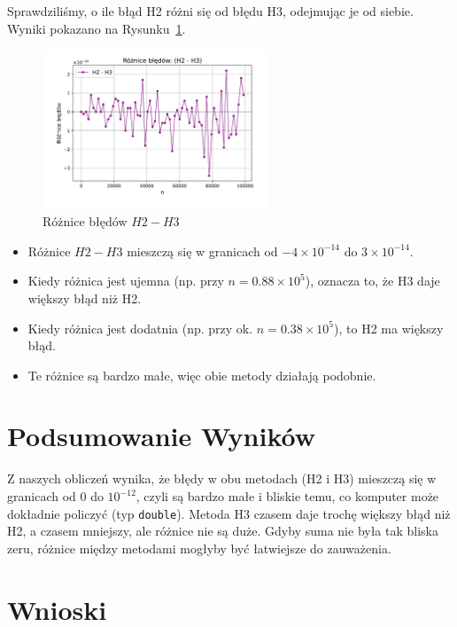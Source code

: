 \documentclass[a4paper,12pt]{article}
\begin{document}
Sprawdziliśmy, o ile błąd H2 różni się od błędu H3, odejmując je od siebie. Wyniki pokazano na Rysunku~\ref{fig:difference}.

\begin{figure}[h]
    \centering
    \includegraphics[width=0.6\textwidth]{roznice_bledow_h2h3.pdf}
    \caption{Różnice błędów \( H2 - H3 \)}
    \label{fig:difference}
\end{figure}

\begin{itemize}
    \item Różnice \( H2 - H3 \) mieszczą się w granicach od \( -4 \times 10^{-14} \) do \( 3 \times 10^{-14} \).
    \item Kiedy różnica jest ujemna (np. przy \( n = 0.88 \times 10^5 \)), oznacza to, że H3 daje większy błąd niż H2.
    \item Kiedy różnica jest dodatnia (np. przy ok. \( n = 0.38 \times 10^5 \)), to H2 ma większy błąd.
    \item Te różnice są bardzo małe, więc obie metody działają podobnie.
\end{itemize}

\section{Podsumowanie Wyników}

Z naszych obliczeń wynika, że błędy w obu metodach (H2 i H3) mieszczą się w granicach od 0 do \( 10^{-12} \), czyli są bardzo małe i bliskie temu, co komputer może dokładnie policzyć (typ \texttt{double}). Metoda H3 czasem daje trochę większy błąd niż H2, a czasem mniejszy, ale różnice nie są duże. Gdyby suma nie była tak bliska zeru, różnice między metodami mogłyby być łatwiejsze do zauważenia.

\section{Wnioski}
\end{document}
